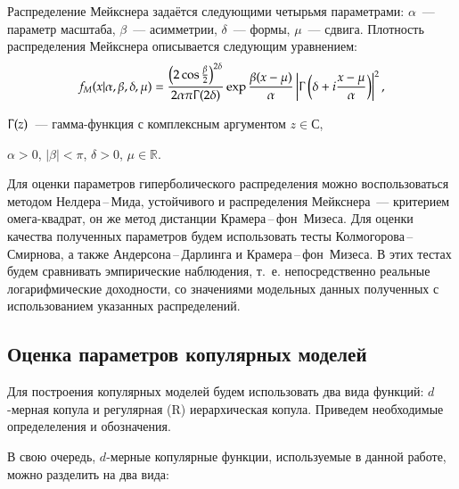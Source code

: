 Распределение Мейкснера задаётся следующими четырьмя параметрами: $\alpha$~--- параметр масштаба, $\beta$~--- асимметрии, $\delta$~--- формы, $\mu$~--- сдвига. Плотность распределения Мейкснера описывается следующим уравнением:
\begin{equation} \label{mpdf}
    f_M(x|\alpha,\beta,\delta,\mu)=\frac{\left(2\cos{\frac{\beta}{2}}\right)^{2\delta}}{2\alpha\pi\Upgamma(2\delta)}\exp{\frac{\beta(x-\mu)}{\alpha}}\left|\Upgamma\left(\delta + i\frac{x-\mu}{\alpha}\right)\right|^2,
\end{equation}
\begin{where}
    \item $\Upgamma(z)$~--- гамма-функция с комплексным аргументом $z \in \mathbb{С}$, 
    \item $\alpha > 0$, $|\beta| < \pi$, $\delta > 0$, $\mu \in \mathbb{R}$.
\end{where}

Для оценки параметров гиперболического распределения можно воспользоваться методом Нелдера\,--\,Мида, устойчивого и распределения Мейкснера~--- критерием омега-квадрат, он же метод дистанции Крамера\,--\,фон~Мизеса. 
Для оценки качества полученных параметров будем использовать тесты Колмогорова\,--\,Смирнова, а также Андерсона\,--\,Дарлинга и Крамера\,--\,фон~Мизеса. 
В этих тестах будем сравнивать эмпирические наблюдения, т.~е. непосредственно реальные логарифмические доходности, со значениями модельных данных полученных с использованием указанных распределений.


\subsection{Оценка параметров копулярных моделей}
\label{methodology:copula}

Для построения копулярных моделей будем использовать два вида функций: $d$-мерная копула и регулярная (R) иерархическая копула. Приведем необходимые определеления и обозначения.

В свою очередь, $d$-мерные копулярные функции, используемые в данной работе, можно разделить на два вида:

